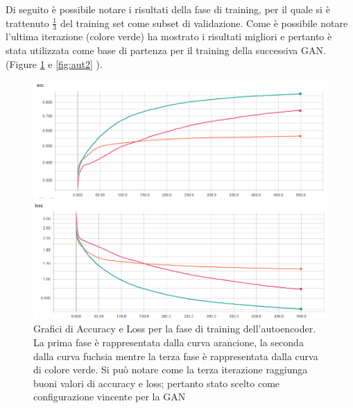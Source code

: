 Di seguito è possibile notare i risultati della fase di training, per il quale si è trattenuto $\frac{1}{3}$ del training set come subset di validazione. Come è possibile notare l'ultima iterazione (colore verde) ha mostrato i risultati migliori e pertanto è stata utilizzata come base di partenza per il training della successiva GAN. (Figure \ref{fig:aut1} e \ref{fig:aut2} ).

\begin{figure}[htbp]
    \centering
    \begin{minipage}[t]{\linewidth}
    	\includegraphics[width=\linewidth]{figures/autoenc.png}
    \end{minipage}\hfill
    \begin{minipage}[b]{\linewidth}
    	\includegraphics[width=\linewidth]{figures/autoenc2.png}
    \end{minipage}
    \caption{Grafici di Accuracy e Loss per la fase di training dell'autoencoder. La prima fase è rappresentata dalla curva arancione, la seconda dalla curva fuchsia mentre la terza fase è rappresentata dalla curva di colore verde. Si può notare come la terza iterazione raggiunga buoni valori di accuracy e loss; pertanto stato scelto come configurazione vincente per la GAN \label{fig:aut1}}
\end{figure}

